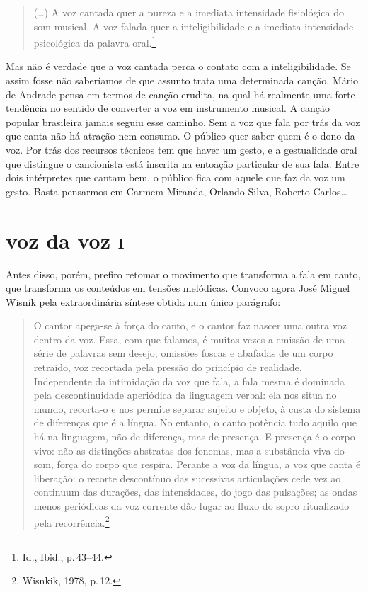 \begin{quote}
(\ldots) A voz cantada quer a pureza e a imediata intensidade fisiológica
do som musical. A voz falada quer a inteligibilidade e a imediata
intensidade psicológica da palavra oral.\footnote{Id., Ibid., p.\,43--44.}
\end{quote}

Mas não é verdade que a voz cantada perca o contato com a
inteligibilidade. Se assim fosse não saberíamos de que assunto trata uma
determinada canção. Mário de Andrade pensa em termos de canção erudita,
na qual há realmente uma forte tendência no sentido de converter a voz
em instrumento musical. A canção popular brasileira jamais seguiu esse
caminho. Sem a voz que fala por trás da voz que canta não há atração nem
consumo. O público quer saber quem é o dono da voz. Por trás dos
recursos técnicos tem que haver um gesto, e a gestualidade oral que
distingue o cancionista está inscrita na entoação particular de sua
fala. Entre dois intérpretes que cantam bem, o público fica com aquele
que faz da voz um gesto. Basta pensarmos em Carmem Miranda, Orlando
Silva, Roberto Carlos\ldots

\section{voz da voz \textsc{i}}

Antes disso, porém, prefiro retomar o movimento que transforma a fala em
canto, que transforma os conteúdos em tensões melódicas. Convoco agora
José Miguel Wisnik pela extraordinária síntese obtida num único
parágrafo:

\begin{quote}
O cantor apega-se à força do canto, e o cantor faz nascer uma outra voz
dentro da voz. Essa, com que falamos, é muitas vezes a emissão de uma
série de palavras sem desejo, omissões foscas e abafadas de um corpo
retraído, voz recortada pela pressão do princípio de realidade.
Independente da intimidação da voz que fala, a fala mesma é dominada
pela descontinuidade aperiódica da linguagem verbal: ela nos situa no
mundo, recorta-o e nos permite separar sujeito e objeto, à custa do
sistema de diferenças que é a língua. No entanto, o canto potência tudo
aquilo que há na linguagem, não de diferença, mas de presença. E
presença é o corpo vivo: não as distinções abstratas dos fonemas, mas a
substância viva do som, força do corpo que respira. Perante a voz da
língua, a voz que canta é liberação: o recorte descontínuo das
sucessivas articulações cede vez ao continuum das durações, das
intensidades, do jogo das pulsações; as ondas menos periódicas da voz
corrente dão lugar ao fluxo do sopro ritualizado pela recorrência.\footnote{Wisnkik, 1978, p.\,12.}
\end{quote}

